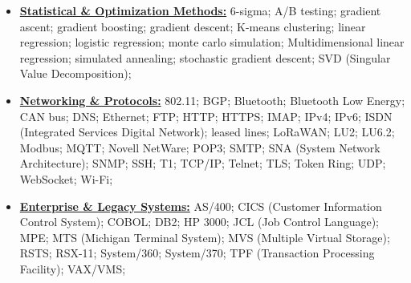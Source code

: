 \documentclass[letterpaper,11pt]{article}
\begin{document}
\begin{multicols}{3}
{\begin{itemize}[leftmargin=0.1in, label={}, itemsep=0pt, parsep=0pt, topsep=0pt, partopsep=0pt]
                DisplayPort;
                dropping frames;
                FFmpeg;
                graphics performance;
                H.264;
                HDMI;
                jitter;
                latency;
                NVENC;
                OpenGL;
                sound card drivers;
                VGA drivers;
                Video Capture;
                Video Capture Card Drivers;
                Video Capture Cards;
                Video Compression;
                Video Decompression;
                video pipeline;
                video transcoding;
                WebRTC;
                YUV;
                \item
                \textbf{\uline{Statistical \& Optimization Methods:}} \hspace{0pt}
                6-sigma;
                A/B testing;
                gradient ascent;
                gradient boosting;
                gradient descent;
                K-means clustering;
                linear regression;
                logistic regression;
                monte carlo simulation;
                Multidimensional linear regression;
                simulated annealing;
                stochastic gradient descent;
                SVD (Singular Value Decomposition);
                \item
                \textbf{\uline{Networking \& Protocols:}} \hspace{0pt}
                802.11;
                BGP;
                Bluetooth;
                Bluetooth Low Energy;
                CAN bus;
                DNS;
                Ethernet;
                FTP;
                HTTP;
                HTTPS;
                IMAP;
                IPv4;
                IPv6;
                ISDN (Integrated Services Digital Network);
                leased lines;
                LoRaWAN;
                LU2;
                LU6.2;
                Modbus;
                MQTT;
                Novell NetWare;
                POP3;
                SMTP;
                SNA (System Network Architecture);
                SNMP;
                SSH;
                T1;
                TCP/IP;
                Telnet;
                TLS;
                Token Ring;
                UDP;
                WebSocket;
                Wi-Fi;

                \item
                \textbf{\uline{Enterprise \& Legacy Systems:}} \hspace{0pt}
                AS/400;
                CICS (Customer Information Control System);
                COBOL;
                DB2;
                HP 3000;
                JCL (Job Control Language);
                MPE;
                MTS (Michigan Terminal System);
                MVS (Multiple Virtual Storage);
                RSTS;
                RSX-11;
                System/360;
                System/370;
                TPF (Transaction Processing Facility);
                VAX/VMS;


\end{itemize}}
\end{multicols}
\end{document}
